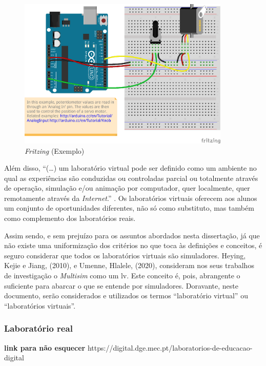 \begin{figure}[hbtp]
    \centering
    \includegraphics[width=0.9\textwidth]{figures/AnalogInputToServo_bb.png}
    \caption{\textit{Fritzing} (Exemplo)}
    \label{fig:fritzing}
\end{figure}

Além disso, ``(\ldots) um laboratório virtual pode ser definido como um ambiente no qual as experiências são conduzidas ou controladas parcial ou totalmente através de operação, simulação e/ou animação por computador, quer localmente, quer remotamente através da \textit{Internet}.'' \cite{EvaluatingLearningExperiencesVirtualLaboratoryHongKong}. Os laboratórios virtuais oferecem aos alunos um conjunto de oportunidades diferentes, não só como substituto, mas também como complemento dos laboratórios reais.

Assim sendo, e sem prejuízo para os assuntos abordados nesta dissertação, já que não existe uma uniformização dos critérios no que toca às definições e conceitos, é seguro considerar que todos os laboratórios virtuais são simuladores. Heying, Kejie e Jiang, (2010), \cite{multisimVLHeying} e Umenne, Hlalele, (2020), \cite{multisimVLUmenne} consideram nos seus trabalhos de investigação o \textit{Multisim}\cite{multisim} como um \acrshort{lv}. Este conceito é, pois, abrangente o suficiente para abarcar o que se entende por simuladores. Doravante, neste documento, serão considerados e utilizados os termos ``laboratório virtual'' ou ``laboratórios virtuais''.

\subsubsection{Laboratório real}
\textbf{link para não esquecer}
https://digital.dge.mec.pt/laboratorios-de-educacao-digital

